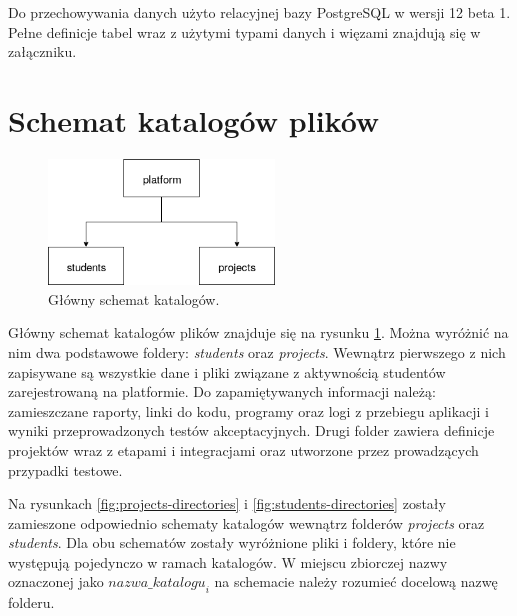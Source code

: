 Do przechowywania danych użyto relacyjnej bazy PostgreSQL w wersji 12 beta 1.
Pełne definicje tabel wraz z użytymi typami danych i więzami znajdują się w załączniku.


\section{Schemat katalogów plików}
\label{directories}

\begin{figure}[h]
    \centering
    \includegraphics[width = 6cm]{chapter05/platform_main_dirs.png}
    \caption{Główny schemat katalogów.}
    \label{fig:platform-main-directories}
\end{figure}

Główny schemat katalogów plików znajduje się na rysunku \ref{fig:platform-main-directories}.
Można wyróżnić na nim dwa podstawowe foldery: \textit{students} oraz \textit{projects}.
Wewnątrz pierwszego z nich zapisywane są wszystkie dane i pliki związane z aktywnością studentów zarejestrowaną na platformie.
Do zapamiętywanych informacji należą: zamieszczane raporty, linki do kodu, programy oraz logi z przebiegu aplikacji i wyniki przeprowadzonych testów akceptacyjnych.
Drugi folder zawiera definicje projektów wraz z etapami i integracjami oraz utworzone przez prowadzących przypadki testowe.

Na rysunkach \ref{fig:projects-directories} i \ref{fig:students-directories} zostały zamieszone odpowiednio schematy katalogów wewnątrz folderów \textit{projects} oraz \textit{students}.
Dla obu schematów zostały wyróżnione pliki i foldery, które nie występują pojedynczo w ramach katalogów.
W miejscu zbiorczej nazwy oznaczonej jako ${nazwa\_katalogu}_{i}$ na schemacie należy rozumieć docelową nazwę folderu.

